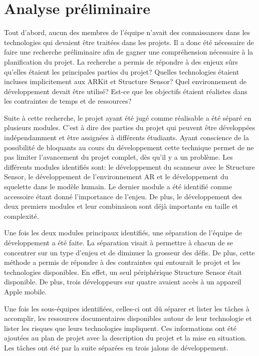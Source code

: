 \documentclass[rapport.tex]{subfiles}
\begin{document}
\section*{Analyse préliminaire}
Tout d’abord, aucun des membres de l’équipe n’avait des connaissances dans les technologies qui devaient être traitées dans les projets. Il a donc été nécessaire de faire une recherche préliminaire afin de gagner une compréhension nécessaire à la planification du projet. La recherche a permis de répondre à des enjeux sûrs qu’elles étaient les principales parties du projet? Quelles technologies étaient incluses implicitement aux ARKit et Structure Sensor? Quel environnement de développement devait être utilisé? Est-ce que les objectifs étaient réalistes dans les contraintes de temps et de ressources?
\par
Suite à cette recherche, le projet ayant été jugé comme réalisable a été séparé en plusieurs modules. C’est à dire des parties du projet qui peuvent être développées indépendamment et être assignées à différents étudiants. Ayant conscience de la possibilité de bloquants au cours du développement cette technique permet de ne pas limiter l’avancement du projet complet, dès qu’il y a un problème. Les différents modules identifiés sont: le développement du scanneur avec le Structure Sensor, le développement de l’environnement AR et le développement du squelette dans le modèle humain. Le dernier module a été identifié comme accessoire étant donné l’importance de l’enjeu. De plus, le développement des deux premiers modules et leur combinaison sont déjà importants en taille et complexité.
\par
Une fois les deux modules principaux identifiés, une séparation de l’équipe de développement a été faite. La séparation visait à permettre à chacun de se concentrer sur un type d’enjeu et de diminuer la grosseur des défis. De plus, cette méthode a permis de répondre à des contraintes qui entourait le projet et les technologies disponibles. En effet, un seul périphérique Structure Sensor était disponible. De plus, trois développeurs sur quatre avaient accès à un appareil Apple mobile.
\par
Une fois les sous-équipes identifiées, celles-ci ont dû séparer et lister les tâches à accomplir, les ressources documentaires disponibles autour de leur technologie et lister les risques que leurs technologies impliquent. Ces informations ont été ajoutées au plan de projet avec la description du projet et la mise en situation. Les tâches ont été par la suite séparées en trois jalons de développement.
\end{document}
